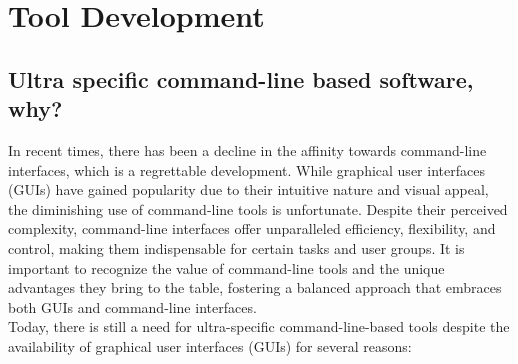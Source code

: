 \documentclass[../Master.tex]{subfiles}
\begin{document}
\chapter{Tool Development}\label{chap:tooldev}

\section{Ultra specific command-line based software, why?}\label{sec:specific-software}
In recent times, there has been a decline in the affinity towards command-line interfaces, which is a regrettable development. While graphical user interfaces (GUIs) have gained popularity due to their intuitive nature and visual appeal, the diminishing use of command-line tools is unfortunate. Despite their perceived complexity, command-line interfaces offer unparalleled efficiency, flexibility, and control, making them indispensable for certain tasks and user groups. It is important to recognize the value of command-line tools and the unique advantages they bring to the table, fostering a balanced approach that embraces both GUIs and command-line interfaces.\\
Today, there is still a need for ultra-specific command-line-based tools despite the availability of graphical user interfaces (GUIs) for several reasons:
\end{document}
